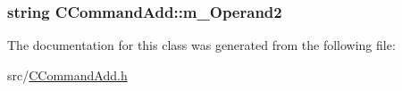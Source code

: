 \subsubsection[{\texorpdfstring{m\+\_\+\+Operand2}{m_Operand2}}]{\setlength{\rightskip}{0pt plus 5cm}string C\+Command\+Add\+::m\+\_\+\+Operand2\hspace{0.3cm}{\ttfamily [private]}}\hypertarget{classCCommandAdd_aa27354561d8bfe6e81409fbe35dfede8}{}\label{classCCommandAdd_aa27354561d8bfe6e81409fbe35dfede8}


The documentation for this class was generated from the following file\+:\begin{DoxyCompactItemize}
\item 
src/\hyperlink{CCommandAdd_8h}{C\+Command\+Add.\+h}\end{DoxyCompactItemize}
